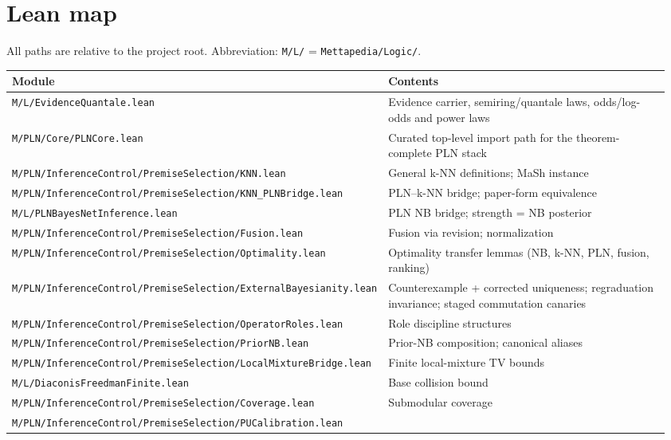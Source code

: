 \documentclass[11pt]{article}
\newcommand{\lpath}[1]{\texttt{\nolinkurl{#1}}}
\begin{document}
\section{Lean map}
\label{sec:leanmap}

All paths are relative to the project root.
Abbreviation: \texttt{M/L/} = \texttt{Mettapedia/Logic/}.

\begin{scriptsize}
\begin{longtable}{@{}L{0.48\linewidth}L{0.48\linewidth}@{}}
\toprule
\textbf{Module} & \textbf{Contents} \\
\midrule
\endhead
\lpath{M/L/EvidenceQuantale.lean}
  & Evidence carrier, semiring/quantale laws, odds/log-odds and power laws \\
\lpath{M/PLN/Core/PLNCore.lean}
  & Curated top-level import path for the theorem-complete PLN stack \\
\lpath{M/PLN/InferenceControl/PremiseSelection/KNN.lean}
  & General k-NN definitions; MaSh instance \\
\lpath{M/PLN/InferenceControl/PremiseSelection/KNN_PLNBridge.lean}
  & PLN--k-NN bridge; paper-form equivalence \\
\lpath{M/L/PLNBayesNetInference.lean}
  & PLN NB bridge; strength = NB posterior \\
\lpath{M/PLN/InferenceControl/PremiseSelection/Fusion.lean}
  & Fusion via revision; normalization \\
\lpath{M/PLN/InferenceControl/PremiseSelection/Optimality.lean}
  & Optimality transfer lemmas (NB, k-NN, PLN, fusion, ranking) \\
\lpath{M/PLN/InferenceControl/PremiseSelection/ExternalBayesianity.lean}
  & Counterexample + corrected uniqueness; regraduation invariance;
    staged commutation canaries \\
\lpath{M/PLN/InferenceControl/PremiseSelection/OperatorRoles.lean}
  & Role discipline structures \\
\lpath{M/PLN/InferenceControl/PremiseSelection/PriorNB.lean}
  & Prior-NB composition; canonical aliases \\
\lpath{M/PLN/InferenceControl/PremiseSelection/LocalMixtureBridge.lean}
  & Finite local-mixture TV bounds \\
\lpath{M/L/DiaconisFreedmanFinite.lean}
  & Base collision bound \\
\lpath{M/PLN/InferenceControl/PremiseSelection/Coverage.lean}
  & Submodular coverage \\
\lpath{M/PLN/InferenceControl/PremiseSelection/PUCalibration.lean}

\end{longtable}
\end{scriptsize}
\end{document}
